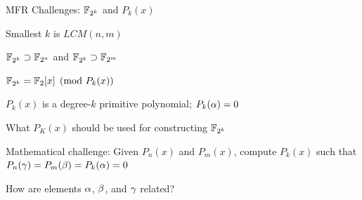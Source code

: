 




\begin{frame}{\large MFR Challenges: ${\mathbb{F}}_{2^k}$ and $P_k(x)$}
\bi
	\item Smallest $k$ is $LCM(n,m)$
	\bi
		\vspace{0.1in}
		\item ${\mathbb{F}}_{2^k} \supset {\mathbb{F}}_{2^n}$ and ${\mathbb{F}}_{2^k} \supset {\mathbb{F}}_{2^m}$
		\vspace{0.1in}
		\item ${\mathbb{F}}_{2^k} = {\mathbb{F}}_{2}[x]\pmod{P_k(x)}$
		\bi
			\item $P_k(x)$ is a degree-$k$ primitive polynomial; $P_k(\alpha) =0$ 
		\ei
	\ei
	\pause
	\vspace{0.1in}

	\item What $P_K(x)$ should be used for constructing ${\mathbb{F}}_{2^k}$
	\vspace{0.1in}
	\pause
	\item  Mathematical challenge: Given $P_n(x)$ and $P_m(x)$, compute $P_k(x)$ such that
	$P_n(\gamma)= P_m(\beta)=P_k(\alpha)=0$
	\pause
	\bi
		\item How are elements $\alpha$, $\beta$, and $\gamma$ related?
	\ei
	\vspace{0.1in}
\ei

\end{frame}

